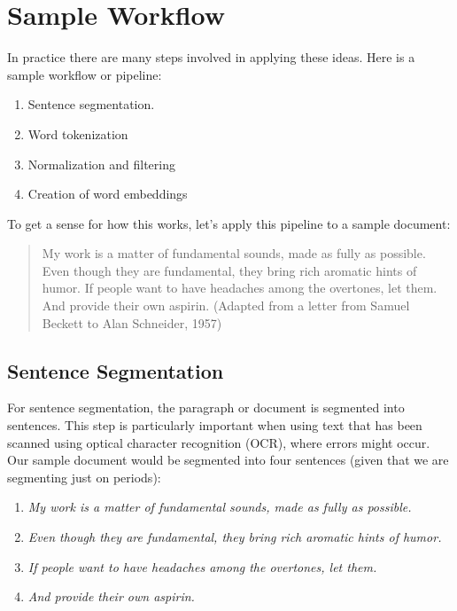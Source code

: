 \section{Sample Workflow}

In practice there are many steps involved in applying these ideas. Here is a sample workflow or pipeline:
\begin{enumerate}
\setlength{\itemsep}{0pt}
\setlength{\parsep}{0pt}
\setlength{\topsep}{0pt}
\item Sentence segmentation.
\item Word tokenization
\item Normalization and filtering
\item Creation of word embeddings
\end{enumerate}

To get a sense for how this works, let's apply this pipeline to a sample document:

\begin{quote}
My work is a matter of fundamental sounds, made as fully as possible. Even though they are fundamental, they bring rich aromatic hints of humor. If people want to have headaches among the overtones, let them. And provide their own aspirin. (Adapted from a letter from Samuel Beckett to Alan Schneider, 1957)
\end{quote}

\subsection{Sentence Segmentation}

For sentence segmentation, the paragraph or document is segmented into sentences. This step is particularly important when using text that has been scanned using optical character recognition (OCR), where errors might occur. Our sample document would be segmented into four sentences (given that we are segmenting just on periods):

\begin{enumerate}
\setlength{\itemsep}{0pt}
\setlength{\parsep}{0pt}
\setlength{\topsep}{0pt}
    \item \textit{My work is a matter of fundamental sounds, made as fully as possible.}
    \item \textit{Even though they are fundamental, they bring rich aromatic hints of humor.}
    \item \textit{If people want to have headaches among the overtones, let them.}
    \item \textit{And provide their own aspirin.}
\end{enumerate}

